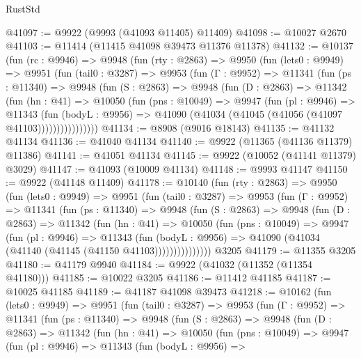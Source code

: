 \begin{lexlean}{RustStd}
\begin{coremodule}
@41097 := @9922 (@9993 (@41093 @11405) @11409)
@41098 := @10027 @2670
@41103 := @11414 (@11415 @41098 @39473 @11376 @11378)
@41132 := @10137
    (fun (rc : @9946) =>
    @9948
      (fun (rty : @2863) =>
      @9950
        (fun (lets0 : @9949) =>
        @9951
          (fun (tail0 : @3287) =>
          @9953
            (fun (Γ : @9952) =>
            @11341
              (fun (ps : @11340) =>
              @9948
                (fun (S : @2863) =>
                @9948
                  (fun (D : @2863) =>
                  @11342
                    (fun (hn : @41) =>
                    @10050
                      (fun (pns : @10049) =>
                      @9947
                        (fun (pl : @9946) =>
                        @11343
                          (fun (bodyL : @9956) =>
                          @41090 (@41034 (@41045 (@41056 (@41097 @41103))))))))))))))))
@41134 := @8908 (@9016 @18143)
@41135 := @41132 @41134
@41136 := @41040 @41134
@41140 := @9922 (@11365 (@41136 @11379) @11386)
@41141 := @41051 @41134
@41145 := @9922 (@10052 (@41141 @11379) @3029)
@41147 := @41093 (@10009 @41134)
@41148 := @9993 @41147
@41150 := @9922 (@41148 @11409)
@41178 := @10140
    (fun (rty : @2863) =>
    @9950
      (fun (lets0 : @9949) =>
      @9951
        (fun (tail0 : @3287) =>
        @9953
          (fun (Γ : @9952) =>
          @11341
            (fun (ps : @11340) =>
            @9948
              (fun (S : @2863) =>
              @9948
                (fun (D : @2863) =>
                @11342
                  (fun (hn : @41) =>
                  @10050
                    (fun (pns : @10049) =>
                    @9947
                      (fun (pl : @9946) =>
                      @11343
                        (fun (bodyL : @9956) =>
                        @41090 (@41034 (@41140 (@41145 (@41150 @41103)))))))))))))))
    @3205
@41179 := @11355 @3205
@41180 := @41179 @9940
@41184 := @9922 (@41032 (@11352 (@11354 @41180)))
@41185 := @10022 @3205
@41186 := @11412 @41185
@41187 := @10025 @41185
@41189 := @41187 @41098 @39473
@41218 := @10162
    (fun (lets0 : @9949) =>
    @9951
      (fun (tail0 : @3287) =>
      @9953
        (fun (Γ : @9952) =>
        @11341
          (fun (ps : @11340) =>
          @9948
            (fun (S : @2863) =>
            @9948
              (fun (D : @2863) =>
              @11342
                (fun (hn : @41) =>
                @10050
                  (fun (pns : @10049) =>
                  @9947
                    (fun (pl : @9946) =>
                    @11343
                      (fun (bodyL : @9956) =>

\end{coremodule}
\end{lexlean}
